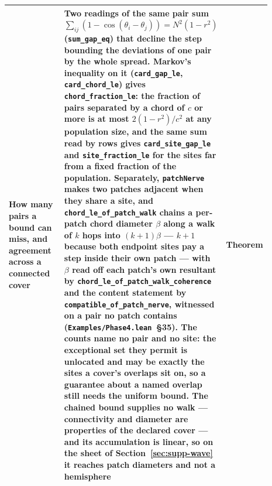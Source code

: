 \documentclass{article}
\begin{document}
\begin{longtable}{|>{\raggedright\arraybackslash}p{0.26\linewidth}|>{\raggedright\arraybackslash}p{0.46\linewidth}|>{\raggedright\arraybackslash}p{0.17\linewidth}|}
How many pairs a bound can miss, and agreement across a connected cover & Two readings of the same pair sum $\sum_{ij}(1-\cos(\theta_i-\theta_j))=N^2(1-r^2)$ (\nolinkurl{sum_gap_eq}) that decline the step bounding the deviations of one pair by the whole spread. Markov's inequality on it (\nolinkurl{card_gap_le}, \nolinkurl{card_chord_le}) gives \nolinkurl{chord_fraction_le}: the fraction of pairs separated by a chord of $c$ or more is at most $2(1-r^2)/c^2$ at any population size, and the same sum read by rows gives \nolinkurl{card_site_gap_le} and \nolinkurl{site_fraction_le} for the sites far from a fixed fraction of the population. Separately, \texttt{patchNerve} makes two patches adjacent when they share a site, and \nolinkurl{chord_le_of_patch_walk} chains a per-patch chord diameter $\beta$ along a walk of $k$ hops into $(k+1)\beta$ --- $k+1$ because both endpoint sites pay a step inside their own patch --- with $\beta$ read off each patch's own resultant by \nolinkurl{chord_le_of_patch_walk_coherence} and the content statement by \nolinkurl{compatible_of_patch_nerve}, witnessed on a pair no patch contains (\nolinkurl{Examples/Phase4.lean}~\S35). The counts name no pair and no site: the exceptional set they permit is unlocated and may be exactly the sites a cover's overlaps sit on, so a guarantee about a named overlap still needs the uniform bound. The chained bound supplies no walk --- connectivity and diameter are properties of the declared cover --- and its accumulation is linear, so on the sheet of Section~\ref{sec:supp-wave} it reaches \waveNerveDiameters{} patch diameters and not a hemisphere & Theorem \\ \hline

\end{longtable}
\end{document}
